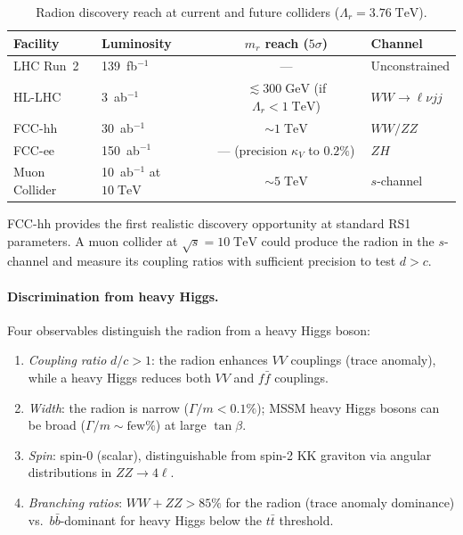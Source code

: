 \begin{table}[htbp]
\centering
\caption{Radion discovery reach at current and future colliders ($\Lambda_r = 3.76\;\mathrm{TeV}$).}
\label{tab:4-radion-reach}
\small
\begin{tabular}{@{}llcl@{}}
\toprule
Facility & Luminosity & $m_r$ reach ($5\sigma$) & Channel \\
\midrule
LHC Run~2 & 139~fb$^{-1}$ & --- & Unconstrained \\
HL-LHC & 3~ab$^{-1}$ & $\lesssim 300\;\mathrm{GeV}$ (if $\Lambda_r < 1\;\mathrm{TeV}$) & $WW \to \ell\nu jj$ \\
FCC-hh & 30~ab$^{-1}$ & $\sim 1\;\mathrm{TeV}$ & $WW/ZZ$ \\
FCC-ee & 150~ab$^{-1}$ & --- (precision $\kappa_V$ to $0.2\%$) & $ZH$ \\
Muon Collider & 10~ab$^{-1}$ at $10\;\mathrm{TeV}$ & $\sim 5\;\mathrm{TeV}$ & $s$-channel \\
\bottomrule
\end{tabular}
\end{table}

FCC-hh provides the first realistic discovery opportunity at standard RS1 parameters.  A muon collider at $\sqrt{s} = 10\;\mathrm{TeV}$ could produce the radion in the $s$-channel and measure its coupling ratios with sufficient precision to test $d > c$.

\paragraph{Discrimination from heavy Higgs.} Four observables distinguish the radion from a heavy Higgs boson:
\begin{enumerate}
  \item \emph{Coupling ratio} $d/c > 1$: the radion enhances $VV$ couplings (trace anomaly), while a heavy Higgs reduces both $VV$ and $f\bar{f}$ couplings.
  \item \emph{Width}: the radion is narrow ($\Gamma/m < 0.1\%$); MSSM heavy Higgs bosons can be broad ($\Gamma/m \sim \text{few}\%$) at large $\tan\beta$.
  \item \emph{Spin}: spin-0 (scalar), distinguishable from spin-2 KK graviton via angular distributions in $ZZ \to 4\ell$.
  \item \emph{Branching ratios}: $WW + ZZ > 85\%$ for the radion (trace anomaly dominance) vs.\ $b\bar{b}$-dominant for heavy Higgs below the $t\bar{t}$ threshold.
\end{enumerate}

